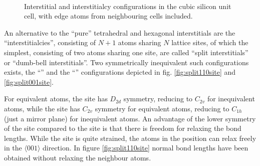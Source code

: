 \documentclass[11pt,bibliography=totoc,index=totoc]{scrbook}   %
\begin{document}
\begin{figure}[htbp]
  \centering
  \\
  \caption{
      Interstitial and interstitialcy configurations in the cubic silicon unit cell, 
      with edge atoms from neighbouring cells included.
  }
  \label{fig:interstitials}
\end{figure}

An alternative to the ``pure'' tetrahedral and hexagonal interstitials are the ``interstitialcies'', consisting of $N+1$ atoms sharing $N$ lattice sites, of which the simplest, consisting of two atoms sharing one site, are called ``split interstitials'' or ``dumb-bell interstitials''.\cite[6]{Pichler:2004}
Two symmetrically inequivalent such configurations exists, the ``'' and the ``'' configurations depicted in fig. \ref{fig:split110site} and \ref{fig:split001site}.

For equivalent atoms, the  site has $D_{2d}$ symmetry, reducing to $C_{2v}$ for inequivalent atoms,
while the  site has $C_{2v}$ symmetry for equivalent atoms, reducing to $C_{1h}$ (just a mirror plane) for inequivalent atoms.\cite[12]{Pichler:2004}
An advantage of the lower symmetry of the  site compared to the  site is that there is freedom for relaxing the bond lengths. 
While the  site is quite strained, the atoms in the  position can relax freely in the $\langle 001 \rangle$ direction. 
In figure \ref{fig:split110site} normal bond lengths have been obtained without relaxing the neighbour atoms.
\end{document}
